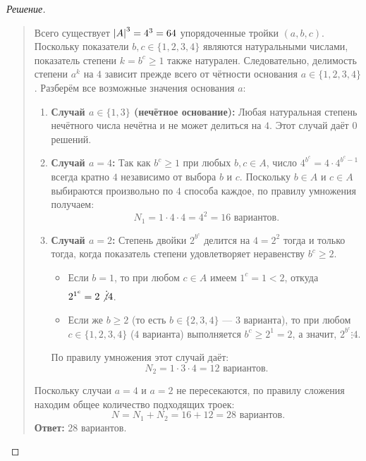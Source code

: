 \begin{proof}[Решение]~\\
    \begin{quote}
        Всего существует $\left| A \right|^3 = 4^3 = 64$ упорядоченные тройки 
        $(a, b, c)$. Поскольку показатели $b, c \in \{1, 2, 3, 4\}$ 
        являются натуральными числами, показатель степени $k = b^c \ge 1$ 
        также натурален. Следовательно, делимость степени $a^k$ на $4$ 
        зависит прежде всего от чётности основания $a \in \{1, 2, 3, 4\}$. 
        Разберём все возможные значения основания $a$:
        \begin{enumerate}
            \item \textbf{Случай $a \in \{1, 3\}$ (нечётное основание):} 
            Любая натуральная степень нечётного числа нечётна и не может 
            делиться на $4$. Этот случай даёт $0$ решений.
            \item \textbf{Случай $a = 4$:} 
            Так как $b^c \ge 1$ при любых $b, c \in A$, число 
            $4^{b^c} = 4 \cdot 4^{b^c - 1}$ всегда кратно $4$ независимо 
            от выбора $b$ и $c$. Поскольку $b \in A$ и $c \in A$ выбираются 
            произвольно по $4$ способа каждое, по правилу умножения получаем:
            \[
                N_1 = 1 \cdot 4 \cdot 4 = 4^2 = 16 \text{ вариантов.}
            \]
            \item \textbf{Случай $a = 2$:} 
            Степень двойки $2^{b^c}$ делится на $4 = 2^2$ тогда и только 
            тогда, когда показатель степени удовлетворяет неравенству 
            $b^c \ge 2$.
            \begin{itemize}
                \item Если $b = 1$, то при любом $c \in A$ имеем 
                $1^c = 1 < 2$, откуда $2^{1^c} = 2 \not\vdots 4$.
                \item Если же $b \ge 2$ (то есть $b \in \{2, 3, 4\}$ --- 
                $3$ варианта), то при любом $c \in \{1, 2, 3, 4\}$ ($4$ 
                варианта) выполняется $b^c \ge 2^1 = 2$, а значит, 
                $2^{b^c} \vdots 4$.
            \end{itemize}
            По правилу умножения этот случай даёт:
            \[
                N_2 = 1 \cdot 3 \cdot 4 = 12 \text{ вариантов.}
            \]
        \end{enumerate}
        Поскольку случаи $a = 4$ и $a = 2$ не пересекаются, по правилу 
        сложения находим общее количество подходящих троек:
        \begin{equation} \label{eq:div_tower_total}
            N = N_1 + N_2 = 16 + 12 = 28 \text{ вариантов.} \tag{1}
        \end{equation}
        \textbf{Ответ:} $28$ вариантов.
    \end{quote}
\end{proof}

